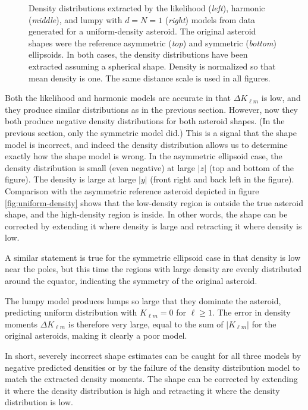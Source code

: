 \documentclass[fleqn,usenatbib]{mnras}
\begin{document}
\begin{figure}
  \caption{Density distributions extracted by the likelihood (\textit{left}), harmonic (\textit{middle}), and lumpy with $d=N=1$ (\textit{right}) models from data generated for a uniform-density asteroid. The original asteroid shapes were the reference asymmetric (\textit{top}) and symmetric (\textit{bottom}) ellipsoids. In both cases, the density distributions have been extracted assuming a spherical shape. Density is normalized so that mean density is one. The same distance scale is used in all figures.}
  \label{fig:sphere-density}
\end{figure}

Both the likelihood and harmonic models are accurate in that $\Delta K_{\ell m}$ is low, and they produce similar distributions as in the previous section. However, now they both produce negative density distributions for both asteroid shapes. (In the previous section, only the symmetric model did.) This is a signal that the shape model is incorrect, and indeed the density distribution allows us to determine exactly how the shape model is wrong. In the asymmetric ellipsoid case, the density distribution is small (even negative) at large $|z|$ (top and bottom of the figure). The density is large at large $|y|$ (front right and back left in the figure). Comparison with the asymmetric reference asteroid depicted in figure \ref{fig:uniform-density} shows that the low-density region is outside the true asteroid shape, and the high-density region is inside. In other words, the shape can be corrected by extending it where density is large and retracting it where density is low.

A similar statement is true for the symmetric ellipsoid case in that density is low near the poles, but this time the regions with large density are evenly distributed around the equator, indicating the symmetry of the original asteroid.

The lumpy model produces lumps so large that they dominate the asteroid, predicting uniform distribution with $K_{\ell m} = 0$ for $\ell \geq 1$. The error in density moments $\Delta K_{\ell m}$ is therefore very large, equal to the sum of $|K_{\ell m}|$ for the original asteroids, making it clearly a poor model.

In short, severely incorrect shape estimates can be caught for all three models by negative predicted densities or by the failure of the density distribution model to match the extracted density moments. The shape can be corrected by extending it where the density distribution is high and retracting it where the density distribution is low.
\end{document}
